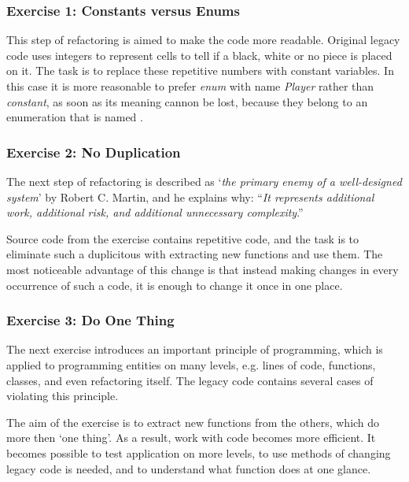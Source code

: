             \subsubsection{Exercise 1: Constants versus Enums}
            This step of refactoring is aimed to make the code more readable. Original legacy code uses integers to represent cells to tell if a black, white or no piece is placed on it. The task is to replace these repetitive numbers with constant variables. In this case it is more reasonable to prefer \textit{enum} with name \textit{Player} rather than \textit{constant}, as soon as its meaning cannon be lost, because they belong to an enumeration that is named \cite[Constants versus Enums]{clean_code}.
            
            \subsubsection{Exercise 2: No Duplication}
            The next step of refactoring is described as `\textit{the primary enemy of a well-designed system}' by Robert C. Martin, and he explains why: ``\textit{It represents additional work, additional risk, and additional unnecessary complexity}\cite[No Duplication]{clean_code}.''
            
            Source code from the exercise contains repetitive code, and the task is to eliminate such a duplicitous with extracting new functions and use them. The most noticeable advantage of this change is that instead making changes in every occurrence of such a code, it is enough to change it once in one place.
            
            \subsubsection{Exercise 3: Do One Thing}
            The next exercise introduces an important principle of programming, which is applied to programming entities on many levels, e.g. lines of code, functions, classes, and even refactoring itself. The legacy code contains several cases of violating this principle\cite[Do One Thing]{clean_code}.
            
            The aim of the exercise is to extract new functions from the others, which do more then `one thing'. As a result, work with code becomes more efficient. It becomes possible to test application on more levels, to use methods of changing legacy code is needed, and to understand what function does at one glance.
            
